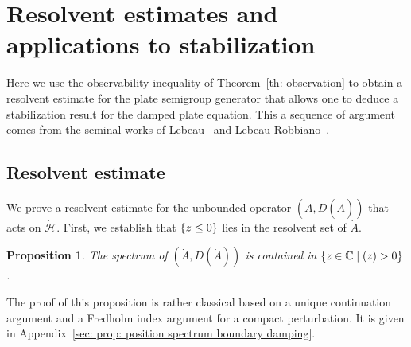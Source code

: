 \documentclass[JEP,XML,SOM,Unicode,published]{cedram}
\let\sep\mid
\theoremstyle{plain}
\newtheorem{proposition}[theorem]{Proposition}
\theoremstyle{definition}
\def\C{\mathbb{C}}
\let \Re \relax
\DeclareMathOperator{\Re}{Re}
\renewcommand{\H}{{\mathcal H}}
\begin{document}
\section{Resolvent estimates and applications to
stabilization}
\label{sec:resolvent, stab}
Here we use the observability inequality of Theorem~\ref{th: observation}
to obtain a resolvent estimate for the plate
semigroup generator that allows one to deduce a stabilization result
for the damped plate equation. This a sequence of argument comes from
the seminal works of Lebeau~\cite{Lebeau:96} and
Lebeau-Robbiano~\cite{LR:97}.

\subsection{Resolvent estimate}
\label{sec: Resolvent estimate}
We prove a resolvent estimate for the unbounded operator $(\dot{A}, D (\dot{A}))$ that
acts on $\dot{\H}$. First, we establish that $\{ \Re z \leq 0\}$ lies in the
resolvent set of $\dot{A}$.

\begin{proposition}
\label{prop: position spectrum boundary damping}
The spectrum of $(\dot{A}, D (\dot{A}))$ is contained in $\{ z \in \C\sep \Re (z) >0\}$.
\end{proposition}
The proof of this proposition is rather classical based on a unique
continuation argument and a Fredholm index argument for a compact
perturbation. It is given in Appendix~\ref{sec: prop:
position spectrum boundary damping}.
\end{document}
